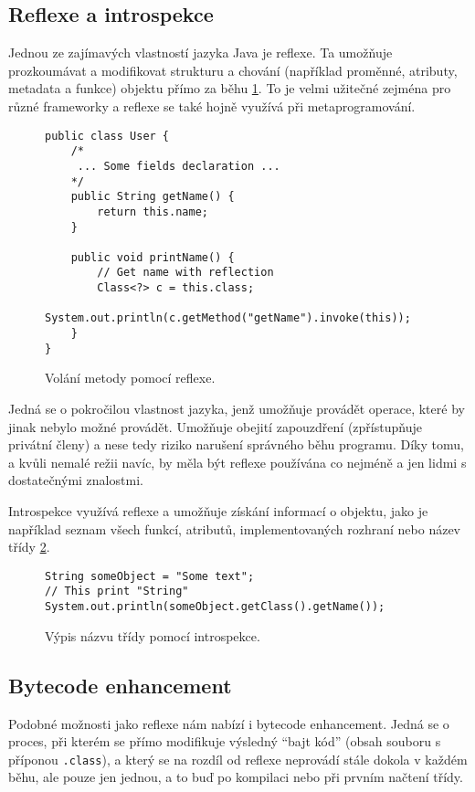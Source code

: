 \subsection{Reflexe a introspekce}
Jednou ze zajímavých vlastností jazyka Java je reflexe. Ta umožňuje prozkoumávat a modifikovat strukturu a chování (například proměnné, atributy, metadata a funkce) objektu přímo za běhu \ref{code:java:reflection}.
To je velmi užitečné zejména pro různé frameworky a reflexe se také hojně využívá při metaprogramování. 
\begin{figure}[!h]
\begin{lstlisting}
public class User {
    /*
     ... Some fields declaration ...
    */
    public String getName() {
        return this.name;
    }
    
    public void printName() {
        // Get name with reflection
        Class<?> c = this.class;
        System.out.println(c.getMethod("getName").invoke(this));
    }
}
\end{lstlisting}
\caption{Volání metody pomocí reflexe.}
\label{code:java:reflection}
\end{figure}

Jedná se o pokročilou vlastnost jazyka, jenž umožňuje provádět operace, které by jinak nebylo možné provádět. Umožňuje obejití zapouzdření (zpřístupňuje privátní členy) a nese tedy riziko narušení správného běhu programu. Díky tomu, a kvůli nemalé režii navíc, by měla být reflexe používána co nejméně a jen lidmi s dostatečnými znalostmi.

Introspekce využívá reflexe a umožňuje získání informací o objektu, jako je například seznam všech funkcí, atributů, implementovaných rozhraní nebo název třídy \ref{code:java:introspection}.
\begin{figure}[!h]
\begin{lstlisting}
String someObject = "Some text";
// This print "String"
System.out.println(someObject.getClass().getName());
\end{lstlisting}
\caption{Výpis názvu třídy pomocí introspekce.}
\label{code:java:introspection}
\end{figure}
\subsection{Bytecode enhancement}
Podobné možnosti jako reflexe nám nabízí i bytecode enhancement. Jedná se o proces, při kterém se přímo modifikuje výsledný "`bajt kód"' (obsah souboru s příponou \texttt{.class}), a který se na rozdíl od reflexe neprovádí stále dokola v každém běhu, ale pouze jen jednou, a to buď po kompilaci nebo při prvním načtení třídy.

